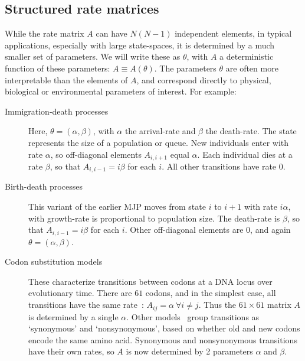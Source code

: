 \subsection{Structured rate matrices}
While the rate matrix $A$ can have $N(N-1)$ independent elements, in typical applications, especially with large state-spaces, it is determined by a much smaller set of parameters. 
We will write these as $\theta$, with $A$ a deterministic function of these parameters: $A \equiv A(\theta)$. 
The parameters $\theta$ are often more interpretable than the elements of $A$, and correspond directly to physical, biological or environmental parameters of interest. 
For example:
\begin{description}
  \item[Immigration-death processes] 
    Here, $\theta = (\alpha,\beta)$, with $\alpha$ the arrival-rate and $\beta$ the death-rate. 
    The state represents the size of a population or queue. 
    New individuals enter with rate $\alpha$, so off-diagonal elements $A_{i,i+1}$ equal $\alpha$.
    Each individual dies at a rate $\beta$, so that $A_{i,i-1}=i\beta$ for each $i$.
    All other transitions have rate $0$. 
  \item[Birth-death processes] 
    This variant of the earlier MJP moves from state $i$ to $i+1$ with rate $i\alpha$, with growth-rate is proportional to population size. 
    The death-rate is $\beta$, so that $A_{i,i-1}=i\beta$ for each $i$.
    Other off-diagonal elements are $0$, and again $\theta=(\alpha,\beta)$.
  \item[Codon substitution models] 
    These characterize transitions between codons at a DNA locus over evolutionary time. 
    There are $61$ codons, and in the simplest case, all transitions have the same rate~\citep{jukescantor69}: $A_{ij} = \alpha\ \forall i \neq j$. 
    Thus the $61\times 61$ matrix $A$ is determined by a single $\alpha$. 
    Other models~\citep{goldman1994codon} group transitions as `synonymous' and `nonsynonymous', based on whether old and new codons encode the same amino acid. 
    Synonymous and nonsynonymous transitions have their own rates, so $A$ is now determined by 2 parameters $\alpha$ and $\beta$. 
\end{description}
